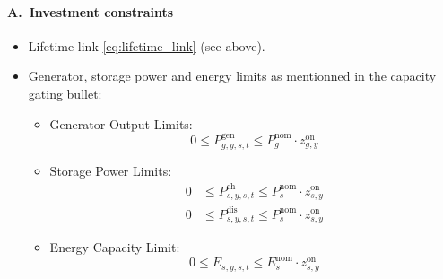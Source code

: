 \paragraph{A.~Investment constraints}
\begin{itemize}
  \item Lifetime link \eqref{eq:lifetime_link} (see above).
      \item Generator, storage power and energy limits as mentionned in the
        capacity gating bullet:
        \begin{itemize}
        \item Generator Output Limits:\\
            \begin{equation}
                  0 \leq P^{\text{gen}}_{g,y,s,t} 
                  \leq P^{\text{nom}}_{g} \cdot z^{\text{on}}_{g,y}
            \end{equation}
    
        \item Storage Power Limits:\\
            \begin{equation}
                  \begin{aligned}
                        0 &\leq P^{\text{ch}}_{s,y,s,t} \leq P^{\text{nom}}_{s} \cdot z^{\text{on}}_{s,y} \\
                        0 &\leq P^{\text{dis}}_{s,y,s,t} \leq P^{\text{nom}}_{s} \cdot z^{\text{on}}_{s,y}
                  \end{aligned}
            \end{equation}
    
        \item Energy Capacity Limit:\\
            \begin{equation}
                  0 \leq E_{s,y,s,t} \leq E^{\text{nom}}_{s} \cdot z^{\text{on}}_{s,y}
            \end{equation}
      \end{itemize}
\end{itemize}

